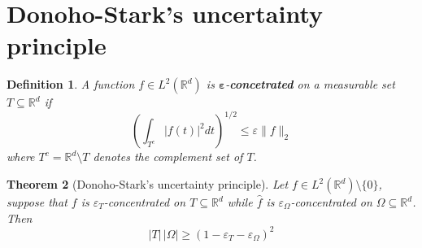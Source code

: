 \documentclass[corpo=11pt, stile=classica, tipotesi=custom,
greek, evenboxes, english]{toptesi}
\numberwithin{equation}{chapter}
\newtheorem{teo}{Theorem}[chapter] %
\newtheorem{defi}[teo]{Definition}
\theoremstyle{remark}
\newcommand{\R}{\mathbb{R}} %
\begin{document}
\section{Donoho-Stark's uncertainty principle}\label{section Donoho-Stark's UP}
\begin{defi}\label{epsilon-concetrated def}
	A function $f \in L^2(\R^d)$ is $\mathbf{\varepsilon}$-\textbf{concetrated} on a measurable set $T \subseteq \R^d$ if
	\begin{equation*}
		\left(\int_{T^c} |f(t)|^2 dt \right)^{1/2} \leq \varepsilon \| f \|_2
	\end{equation*}
	where $T^c = \R^d \setminus T$ denotes the complement set of $T$.
\end{defi}
\begin{teo}[Donoho-Stark's uncertainty principle]\label{Donoho-Stark's uncertainty principle theorem}
	Let $f \in L^2(\R^d) \setminus \{0\}$, suppose that $f$ is $\varepsilon_T$-concentrated on $T \subseteq \R^d$ while $\hat{f}$ is $\varepsilon_{\Omega}$-concentrated on $\Omega \subseteq \R^d$. Then
	\begin{equation}\label{Donoho-Stark's uncertainty principle formula}
		|T| \, |\Omega| \geq (1 - \varepsilon_T - \varepsilon_{\Omega})^2
	\end{equation}
\end{teo}
\end{document}
